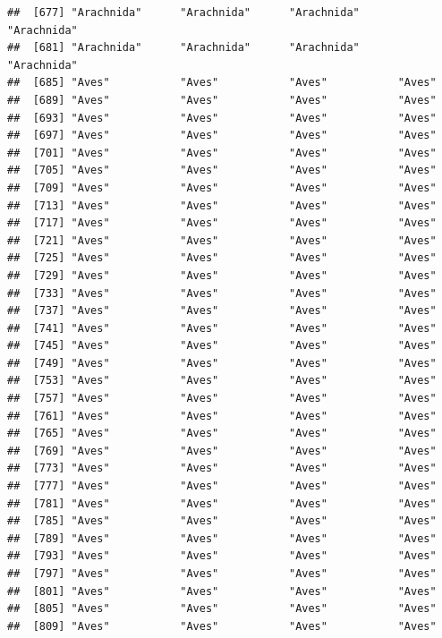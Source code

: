 \documentclass[
]{article}
\begin{document}
\begin{verbatim}
##  [677] "Arachnida"      "Arachnida"      "Arachnida"      "Arachnida"     
##  [681] "Arachnida"      "Arachnida"      "Arachnida"      "Arachnida"     
##  [685] "Aves"           "Aves"           "Aves"           "Aves"          
##  [689] "Aves"           "Aves"           "Aves"           "Aves"          
##  [693] "Aves"           "Aves"           "Aves"           "Aves"          
##  [697] "Aves"           "Aves"           "Aves"           "Aves"          
##  [701] "Aves"           "Aves"           "Aves"           "Aves"          
##  [705] "Aves"           "Aves"           "Aves"           "Aves"          
##  [709] "Aves"           "Aves"           "Aves"           "Aves"          
##  [713] "Aves"           "Aves"           "Aves"           "Aves"          
##  [717] "Aves"           "Aves"           "Aves"           "Aves"          
##  [721] "Aves"           "Aves"           "Aves"           "Aves"          
##  [725] "Aves"           "Aves"           "Aves"           "Aves"          
##  [729] "Aves"           "Aves"           "Aves"           "Aves"          
##  [733] "Aves"           "Aves"           "Aves"           "Aves"          
##  [737] "Aves"           "Aves"           "Aves"           "Aves"          
##  [741] "Aves"           "Aves"           "Aves"           "Aves"          
##  [745] "Aves"           "Aves"           "Aves"           "Aves"          
##  [749] "Aves"           "Aves"           "Aves"           "Aves"          
##  [753] "Aves"           "Aves"           "Aves"           "Aves"          
##  [757] "Aves"           "Aves"           "Aves"           "Aves"          
##  [761] "Aves"           "Aves"           "Aves"           "Aves"          
##  [765] "Aves"           "Aves"           "Aves"           "Aves"          
##  [769] "Aves"           "Aves"           "Aves"           "Aves"          
##  [773] "Aves"           "Aves"           "Aves"           "Aves"          
##  [777] "Aves"           "Aves"           "Aves"           "Aves"          
##  [781] "Aves"           "Aves"           "Aves"           "Aves"          
##  [785] "Aves"           "Aves"           "Aves"           "Aves"          
##  [789] "Aves"           "Aves"           "Aves"           "Aves"          
##  [793] "Aves"           "Aves"           "Aves"           "Aves"          
##  [797] "Aves"           "Aves"           "Aves"           "Aves"          
##  [801] "Aves"           "Aves"           "Aves"           "Aves"          
##  [805] "Aves"           "Aves"           "Aves"           "Aves"          
##  [809] "Aves"           "Aves"           "Aves"           "Aves"          

\end{verbatim}
\end{document}
